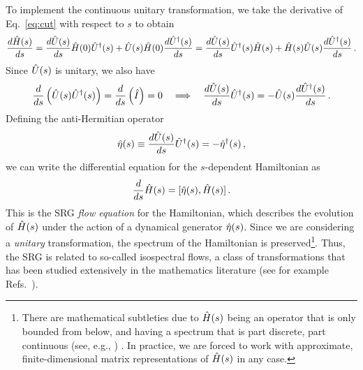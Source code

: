 {To implement the continuous unitary transformation, we take the derivative of
Eq.~\eqref{eq:cut} with respect to $s$ to obtain 
\begin{equation}
   \frac{d {\hat{H}(s)}} {d {s}}  =  \frac{d {\hat{U}(s)}} {d {s}} \hat{H}(0)\hat{U}^\dag(s) + \hat{U}(s)\hat{H}(0) \frac{d {\hat{U}^\dag(s)}} {d {s}} 
                   =  \frac{d {\hat{U}(s)}} {d {s}} \hat{U}^\dag(s)\hat{H}(s) + \hat{H}(s)\hat{U}(s) \frac{d {\hat{U}^\dag(s)}} {d {s}} \,.
\end{equation}
Since $\hat{U}(s)$ is unitary, we also have
\begin{equation}
   \frac{d {}} {d {s}} \left(\hat{U}(s)\hat{U}^\dag(s)\right) =  \frac{d {}} {d {s}}  \left(\hat{I}\right) = 0 \quad \Longrightarrow 
  \quad  \frac{d {\hat{U}(s)}} {d {s}} \hat{U}^\dag(s) = - \hat{U}(s) \frac{d {\hat{U}^\dag(s)}} {d {s}} \,.
\end{equation}
Defining the anti-Hermitian operator
\begin{equation}\label{eq:def_eta}
  \etaO(s) \equiv \totd{\UO(s)}{s} \UUO(s) = - \eetaO(s)\,,
\end{equation}
we can write the differential equation for the $s$-dependent Hamiltonian as
\begin{equation} \label{eq:opflow}
  \totd{}{s} \HO(s) = \comm{\etaO(s)}{\HO(s)}\,.
\end{equation}
This is the SRG \emph{flow equation} for the Hamiltonian, which describes the 
evolution of $\hat{H}(s)$ under the action of a dynamical generator $\hat{\eta}(s)$. 
Since we are considering a \emph{unitary} transformation, the spectrum of the 
Hamiltonian is preserved\footnote{There are mathematical subtleties due to 
$\hat{H}(s)$ being an operator that is only bounded from below, and having a 
spectrum that is part discrete, part continuous (see, e.g., \cite{Bach:2010zr,Boutin:2016ef})
. In practice, we are forced
to work with approximate, finite-dimensional matrix representations of $\hat{H}(s)$
in any case.}. Thus, the SRG is related to so-called isospectral flows, a class 
of transformations that has been studied extensively in the mathematics literature 
(see for example Refs.~\cite{Brockett:1991kx,Chu:1994vn,Chu:1995ys,Bach:2010zr,Boutin:2016ef}).

}
